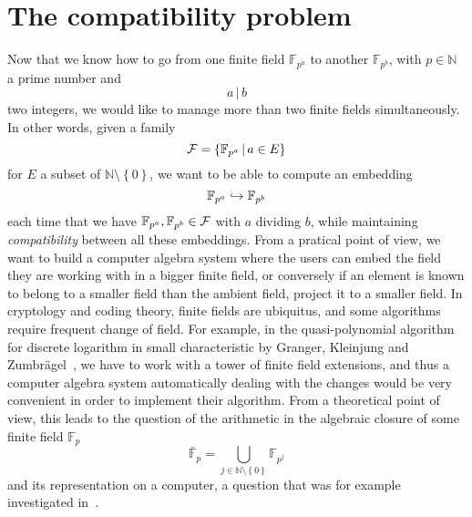 \clearpage
\section{The compatibility problem}
\label{sec:compatibility-problem}

Now that we know how to go from one finite field $\mathbb{F}_{p^a}$ to another
$\mathbb{F}_{p^b}$, with $p\in\mathbb{N}$ a prime number and
\[
  a\,|\,b
\]
two integers, we would like to manage more than two finite fields
simultaneously. In other words, given a family
\[
  \mathcal{F}=\left\{ \mathbb{F}_{p^{a}}\,|\,a\in E \right\}
\]
for $E$ a subset of $\mathbb{N}\setminus\left\{ 0 \right\}$,
we want to be able to compute an embedding
\[
  \mathbb{F}_{p^a}\hookrightarrow\mathbb{F}_{p^b}
\]
each time that we have $\mathbb{F}_{p^a}, \mathbb{F}_{p^b}\in\mathcal{F}$ with $a$
dividing $b$, while maintaining \emph{compatibility} between all these
embeddings. From a pratical point of view, we want to build a computer algebra
system where the users can embed the field they are working with in a bigger
finite field, or conversely if an element is known to belong to a smaller field
than the ambient field, project it to a smaller field. In cryptology and coding
theory, finite fields are ubiquitus, and some algorithms require frequent change
of field. For example, in the
quasi-polynomial algorithm for discrete logarithm in small characteristic by
Granger, Kleinjung and Zumbrägel~\cite{GKZ14}, we have to work with a tower of
finite field extensions, and thus a computer algebra system automatically
dealing with the changes would be very convenient in order to implement their
algorithm. From a theoretical point of view, this leads to the question of the
arithmetic in the algebraic closure of some finite field $\mathbb{F}_p$
\[
  \bar{\mathbb{F}}_p=\bigcup_{j\in\mathbb{N}\setminus\left\{ 0
  \right\}}\mathbb{F}_{p^j}
\]
and its representation on a computer, a question that was for example
investigated in~\cite{DDS14}. 

